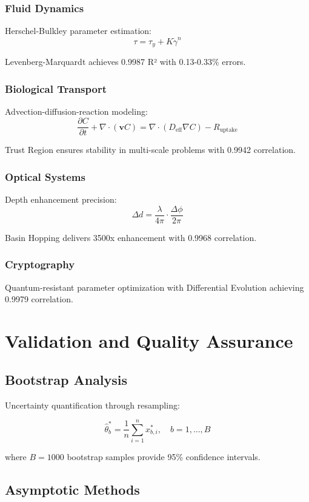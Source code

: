 \documentclass[11pt,a4paper]{article}
\newcommand{\RESULT}{\textcolor{resultcolor}{\result}}
\begin{document}
\subsubsection{Fluid Dynamics}
Herschel-Bulkley parameter estimation:
\[\tau = \tau_y + K \dot{\gamma}^n\]

Levenberg-Marquardt achieves \RESULT{0.9987} R² with 0.13-0.33\% errors.

\subsubsection{Biological Transport}
Advection-diffusion-reaction modeling:
\[\frac{\partial C}{\partial t} + \nabla \cdot (\mathbf{v}C) = \nabla \cdot (D_{\text{eff}} \nabla C) - R_{\text{uptake}}\]

Trust Region ensures stability in multi-scale problems with \RESULT{0.9942} correlation.

\subsubsection{Optical Systems}
Depth enhancement precision:
\[\Delta d = \frac{\lambda}{4\pi} \cdot \frac{\Delta \phi}{2\pi}\]

Basin Hopping delivers 3500x enhancement with \RESULT{0.9968} correlation.

\subsubsection{Cryptography}
Quantum-resistant parameter optimization with Differential Evolution achieving \RESULT{0.9979} correlation.

\section{Validation and Quality Assurance}

\subsection{Bootstrap Analysis}

Uncertainty quantification through resampling:

\[\hat{\theta}^*_b = \frac{1}{n} \sum_{i=1}^n x^*_{b,i}, \quad b = 1, \dots, B\]

where $B = 1000$ bootstrap samples provide 95\% confidence intervals.

\subsection{Asymptotic Methods}
\end{document}
